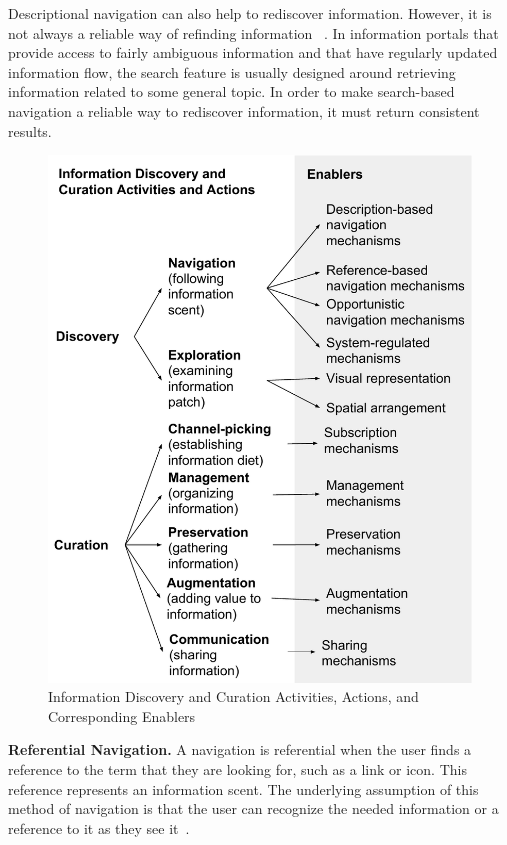 \documentclass{sigchi}
\begin{document}
{{Descriptional navigation can also help to rediscover information. However, it is not always a reliable way of refinding information ~\cite{cockburn2003improving}. In information portals that provide access to fairly ambiguous information and that have regularly updated information flow, the search feature is usually designed around retrieving information related to some general topic. In order to make search-based navigation a reliable way to rediscover information, it must return consistent results. 
} %


\begin{figure}[ht!]
	\noindent
	\centering
    \includegraphics[width=\linewidth]{figures/framework_enablers.pdf}
	\caption{Information Discovery and Curation Activities, Actions, and Corresponding Enablers}
	\label{fig:enablers} 
\end{figure}


\textbf{Referential Navigation.}
A navigation is referential when the user finds a reference to the term that they are looking for, such as a link or icon. This reference represents an information scent. The underlying assumption of this method of navigation is that the user can recognize the needed information or a reference to it as they see it~\cite{waterworth1991model}. 

}
\end{document}
